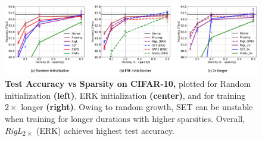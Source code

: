 \begin{figure}[!t]
    \centering
    \includegraphics[width=1\textwidth]{../openreview/figs/cifar10_main.pdf}
    \captionsetup{aboveskip=\figureaboveskip,belowskip=\figurebelowskip}
    \caption{\textbf{Test Accuracy vs Sparsity on CIFAR-10,} plotted for Random initialization \textbf{(left)}, ERK initialization \textbf{(center)}, and for training $2\times$ longer \textbf{(right)}. Owing to random growth, SET can be unstable when training for longer durations with higher sparsities. Overall, \textit{RigL}\textsubscript{$2 \times$} (ERK) achieves highest test accuracy.}
    \label{fig:cifar10-main-results}
\end{figure}